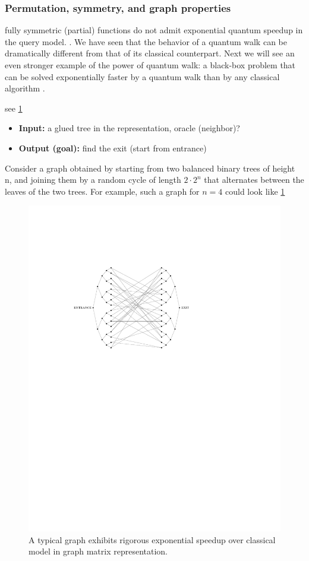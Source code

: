 \subsubsection{Permutation, symmetry, and graph properties}
fully symmetric (partial) functions do not admit exponential quantum speedup in the query model.
\cite{ben-davidSymmetriesGraphProperties2020}.
We have seen that the behavior of a quantum walk can be dramatically different from that of its classical counterpart. Next we will see an even stronger example of the power of quantum walk: a black-box problem that can be solved exponentially faster by a quantum walk than by any classical algorithm \cite{childsExponentialAlgorithmicSpeedup2003}.
\begin{problem}
	see \cref{fig:glued_tree}
	\begin{itemize}
		\item \textbf{Input:} a glued tree in the  representation, oracle (neighbor)?
		\item \textbf{Output (goal):} find the exit (start from entrance)
	\end{itemize}
\end{problem}
Consider a graph obtained by starting from two balanced binary trees of height n, and joining them by a random cycle of length $2\cdot 2^n$ that alternates between the leaves of the two trees. 
For example, such a graph for $n = 4$ could look like \cref{fig:glued_tree}
\begin{figure}[!ht]
	\centering
	\includegraphics[width=.5\linewidth]{glued_tree.pdf}
	\caption{A typical graph exhibits rigorous exponential speedup over classical model in graph matrix representation. \cite{childsExponentialAlgorithmicSpeedup2003}}
	\label{fig:glued_tree}
\end{figure}

